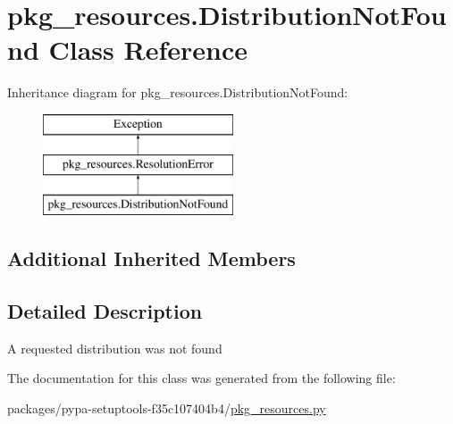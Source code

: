 \hypertarget{classpkg__resources_1_1DistributionNotFound}{}\section{pkg\+\_\+resources.\+Distribution\+Not\+Found Class Reference}
\label{classpkg__resources_1_1DistributionNotFound}
Inheritance diagram for pkg\+\_\+resources.\+Distribution\+Not\+Found\+:\begin{figure}[H]
\begin{center}
\leavevmode
\includegraphics[height=3.000000cm]{classpkg__resources_1_1DistributionNotFound}
\end{center}
\end{figure}
\subsection*{Additional Inherited Members}


\subsection{Detailed Description}
\begin{DoxyVerb}A requested distribution was not found\end{DoxyVerb}
 

The documentation for this class was generated from the following file\+:\begin{DoxyCompactItemize}
\item 
packages/pypa-\/setuptools-\/f35c107404b4/\hyperlink{pkg__resources_8py}{pkg\+\_\+resources.\+py}\end{DoxyCompactItemize}

